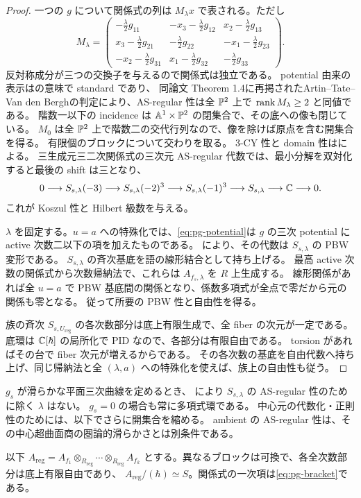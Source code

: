 \begin{proof}
一つの $g$ について関係式の列は $M_\lambda x$ で表される。ただし
\begin{equation}
M_\lambda=
\begin{pmatrix}
-\frac\lambda2g_{11}&-x_3-\frac\lambda2g_{12}&x_2-\frac\lambda2g_{13}\\
x_3-\frac\lambda2g_{21}&-\frac\lambda2g_{22}&-x_1-\frac\lambda2g_{23}\\
-x_2-\frac\lambda2g_{31}&x_1-\frac\lambda2g_{32}&-\frac\lambda2g_{33}
\end{pmatrix}.
\end{equation}
反対称成分が三つの交換子を与えるので関係式は独立である。
potential 由来の表示は\cite[Corollary 2.7]{PMoriSmith}の意味で standard であり、
同論文 Theorem 1.4に再掲されたArtin--Tate--Van den Berghの判定により、AS-regular 性は全 $\mathbb P^2$ 上で $\operatorname{rank} M_\lambda\geq2$ と同値である。
階数一以下の incidence は $\mathbb A^1\times\mathbb P^2$ の閉集合で、その底への像も閉じている。
$M_0$ は全 $\mathbb P^2$ 上で階数二の交代行列なので、像を除けば原点を含む開集合を得る。
有限個のブロックについて交わりを取る。
3-CY 性と domain 性は\cite[Corollary 2.9]{PMoriSmith}による。
三生成元三二次関係式の三次元 AS-regular 代数では、最小分解を双対化すると最後の shift は三となり、
\begin{equation}
0\longrightarrow S_{s,\lambda}(-3)\longrightarrow S_{s,\lambda}(-2)^3
\longrightarrow S_{s,\lambda}(-1)^3\longrightarrow S_{s,\lambda}
\longrightarrow\mathbb C\longrightarrow0.
\end{equation}
これが Koszul 性と Hilbert 級数を与える。

$\lambda$ を固定する。$u=a$ への特殊化では、\eqref{eq:pg-potential}は
$g$ の三次 potential に active 次数二以下の項を加えたものである。
\cite[Theorem 1.1(i)]{PBergerTaillefer}により、その代数は $S_{s,\lambda}$ の PBW 変形である。
$S_{s,\lambda}$ の斉次基底を語の線形結合として持ち上げる。
最高 active 次数の関係式から次数帰納法で、これらは $A_{f_s,\lambda}$ を $R$ 上生成する。
線形関係があれば全 $u=a$ で PBW 基底間の関係となり、係数多項式が全点で零だから元の関係も零となる。
従って所要の PBW 性と自由性を得る。

族の斉次 $S_{s,U_{\mathrm{reg}}}$ の各次数部分は底上有限生成で、全 fiber の次元が一定である。
底環は $\mathbb C[\hbar]$ の局所化で PID なので、各部分は有限自由である。
torsion があればその台で fiber 次元が増えるからである。
その各次数の基底を自由代数へ持ち上げ、同じ帰納法と全 $(\lambda,a)$ への特殊化を使えば、族上の自由性も従う。
\end{proof}
\begin{remark}\label{rem:pg-regular-all}
$g_s$ が滑らかな平面三次曲線を定めるとき、
\cite[Theorem 4.2(1)]{PMoriSmith}により $S_{s,\lambda}$ の AS-regular 性のために除く $\lambda$ はない。
$g_s=0$ の場合も常に多項式環である。
中心元の代数化・正則性のためには、以下でさらに開集合を縮める。
ambient の AS-regular 性は、その中心超曲面商の圏論的滑らかさとは別条件である。
\end{remark}
以下
$A_{\mathrm{reg}}=A_{f_1}\otimes_{R_{\mathrm{reg}}}\cdots\otimes_{R_{\mathrm{reg}}}A_{f_k}$
とする。異なるブロックは可換で、各全次数部分は底上有限自由であり、
$A_{\mathrm{reg}}/(\hbar)\simeq S$。関係式の一次項は\eqref{eq:pg-bracket}である。

